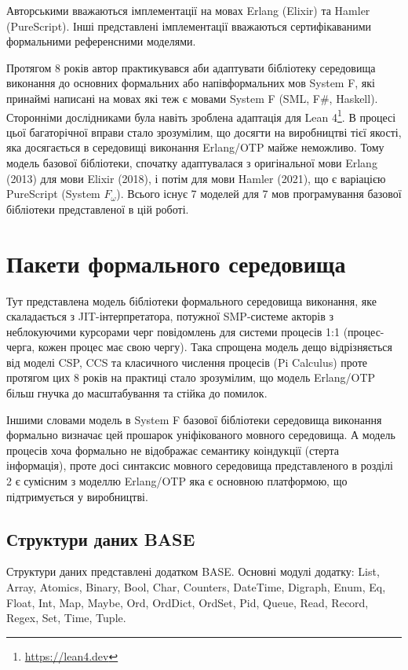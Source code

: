 Авторськими вважаються імплементації на мовах Erlang (Elixir) та Hamler (PureScript).
Інші представлені імплементації вважаються сертифікаваними формальними референсними моделями.

Протягом 8 років автор практикувався аби адаптувати бібліотеку середовища виконання
до основних формальних або напівформальних мов System F, які принаймі написані
на мовах які теж є мовами System F (SML, F\#, Haskell). Сторонніми дослідниками
була навіть зроблена адаптація для Lean 4\footnote{\url{https://lean4.dev}}.
В процесі цьої багаторічної вправи стало зрозумілим, що досягти на виробництві
тієї якості, яка досягається в середовищі виконання Erlang/OTP майже неможливо.
Тому модель базової бібліотеки, спочатку адаптувалася з оригінальної мови Erlang (2013)
для мови Elixir (2018), і потім для мови Hamler (2021), що є варіацією PureScript (System $F_\omega$).
Всього існує 7 моделей для 7 мов програмування базової бібліотеки представленої в цій роботі.

\section{Пакети формального середовища}
Тут представлена модель бібліотеки формального середовища виконання, яке
скаладається з JIT-інтерпретатора, потужної SMP-системе акторів з неблокуючими
курсорами черг повідомлень для системи процесів 1:1 (процес-черга, кожен процес
має свою чергу). Така спрощена модель дещо відрізняється від моделі CSP, CCS
та класичного числення процесів (Pi Calculus) проте протягом цих 8 років на практиці
стало зрозумілим, що модель Erlang/OTP більш гнучка до масштабування та стійка до помилок.

Іншими словами модель в System F базової бібліотеки
середовища виконання формально визначає цей прошарок уніфікованого мовного середовища.
А модель процесів хоча формально не відображає семантику коіндукції (стерта інформація),
проте досі синтаксис мовного середовища представленого в розділі 2 є сумісним з моделлю
Erlang/OTP яка є основною платформою, що підтримується у виробництві.

\subsection{Структури даних BASE}
Структури даних представлені додатком BASE. Основні модулі додатку:
List, Array, Atomics, Binary, Bool, Char, Counters, DateTime, Digraph,
Enum, Eq, Float, Int, Map, Maybe, Ord, OrdDict, OrdSet, Pid, Queue,
Read, Record, Regex, Set, Time, Tuple.

